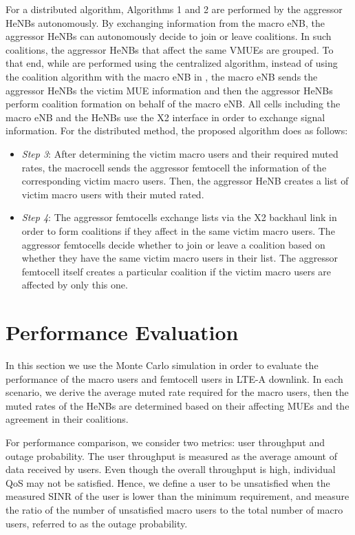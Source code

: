 \documentclass[paper]{ieice}
\begin{document}
For a distributed algorithm, Algorithms 1 and 2 are performed by the aggressor HeNBs autonomously. By exchanging information from the macro eNB, the aggressor HeNBs can autonomously decide to join or leave coalitions. In such coalitions, the aggressor HeNBs that affect the same VMUEs are grouped. To that end, while  are performed using the centralized algorithm, instead of using the coalition algorithm with the macro eNB in , the macro eNB sends the aggressor HeNBs the victim MUE information and then the aggressor HeNBs perform coalition formation on behalf of the macro eNB. All cells including the macro eNB and the HeNBs use the X2 interface in order to exchange signal information. For the distributed method, the proposed algorithm does   as follows:
\begin{itemize}
  \item \emph{Step 3}: After determining the victim macro users and their required muted rates, the macrocell sends the aggressor femtocell the information of the corresponding victim macro users. Then, the aggressor HeNB creates a list of victim macro users with their muted rated.

  \item \emph{Step 4}: The aggressor femtocells exchange lists via the X2 backhaul link in order to form coalitions if they affect in the same victim macro users. The aggressor femtocells decide whether to join or leave a coalition based on whether they have the same victim macro users in their list. The aggressor femtocell itself creates a particular coalition if the victim macro users are affected by only this one.
\end{itemize}

\section{Performance Evaluation}
\label{Evaluation}
In this section we use the Monte Carlo simulation in order to evaluate the performance of the macro users and femtocell users in LTE-A downlink. In each scenario, we derive the average muted rate required for the macro users, then the muted rates of the HeNBs are determined based on their affecting MUEs and the agreement in their coalitions.

For performance comparison, we consider two metrics: user throughput and outage probability. The user throughput is measured as the average amount of data received by users. Even though the overall throughput is high, individual QoS may not be satisfied. Hence, we define a user to be unsatisfied when the measured SINR of the user is lower than the minimum requirement, and  measure the ratio of the number of unsatisfied macro users to the total number of macro users, referred to as the outage probability.
\end{document}
